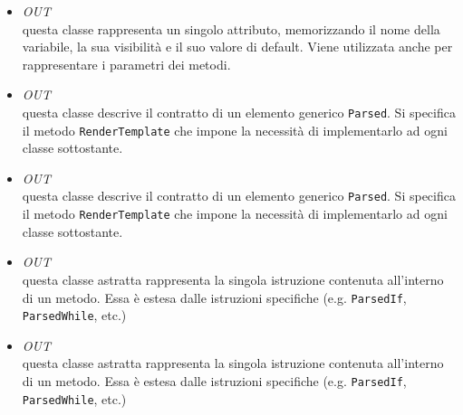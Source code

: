 \begin{itemize}
\begin{itemize}
\item \textit{OUT} \hyperref[\nogloxy{swedesigner::server::project::ParsedAttribute}]{}\\
questa classe rappresenta un singolo attributo, memorizzando il nome della variabile, la sua visibilità e il suo valore di default. Viene utilizzata anche per rappresentare i parametri dei metodi.
\item \textit{OUT} \hyperref[\nogloxy{swedesigner::server::project::ParsedElement}]{}\\
questa classe descrive il contratto di un elemento generico \texttt{Parsed}. Si specifica il metodo \texttt{RenderTemplate} che impone la necessità di implementarlo ad ogni classe sottostante.
\item \textit{OUT} \hyperref[\nogloxy{swedesigner::server::project::ParsedElement}]{}\\
questa classe descrive il contratto di un elemento generico \texttt{Parsed}. Si specifica il metodo \texttt{RenderTemplate} che impone la necessità di implementarlo ad ogni classe sottostante.
\item \textit{OUT} \hyperref[\nogloxy{swedesigner::server::project::ParsedInstruction}]{}\\
questa classe astratta rappresenta la singola istruzione contenuta all'interno di un metodo. Essa è estesa dalle istruzioni specifiche (e.g. \texttt{ParsedIf}, \texttt{ParsedWhile}, etc.)
\item \textit{OUT} \hyperref[\nogloxy{swedesigner::server::project::ParsedInstruction}]{}\\
questa classe astratta rappresenta la singola istruzione contenuta all'interno di un metodo. Essa è estesa dalle istruzioni specifiche (e.g. \texttt{ParsedIf}, \texttt{ParsedWhile}, etc.)
\end{itemize}
\end{itemize}

